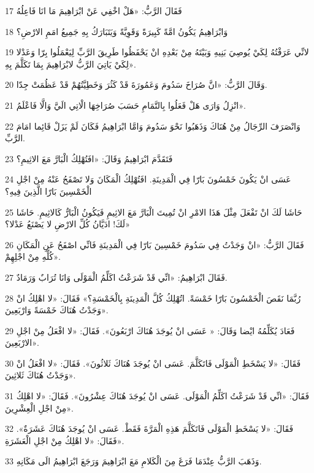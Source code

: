 \par 17 فَقَالَ الرَّبُّ: «هَلْ اخْفِي عَنْ ابْرَاهِيمَ مَا انَا فَاعِلُهُ
\par 18 وَابْرَاهِيمُ يَكُونُ امَّةً كَبِيرَةً وَقَوِيَّةً وَيَتَبَارَكُ بِهِ جَمِيعُ امَمِ الارْضِ؟
\par 19 لانِّي عَرَفْتُهُ لِكَيْ يُوصِيَ بَنِيهِ وَبَيْتَهُ مِنْ بَعْدِهِ انْ يَحْفَظُوا طَرِيقَ الرَّبِّ لِيَعْمَلُوا بِرّا وَعَدْلا لِكَيْ يَاتِيَ الرَّبُّ لابْرَاهِيمَ بِمَا تَكَلَّمَ بِهِ».
\par 20 وَقَالَ الرَّبُّ: «انَّ صُرَاخَ سَدُومَ وَعَمُورَةَ قَدْ كَثُرَ وَخَطِيَّتُهُمْ قَدْ عَظُمَتْ جِدّا.
\par 21 انْزِلُ وَارَى هَلْ فَعَلُوا بِالتَّمَامِ حَسَبَ صُرَاخِهَا الْاتِي الَيَّ وَالَّا فَاعْلَمُ».
\par 22 وَانْصَرَفَ الرِّجَالُ مِنْ هُنَاكَ وَذَهَبُوا نَحْوَ سَدُومَ وَامَّا ابْرَاهِيمُ فَكَانَ لَمْ يَزَلْ قَائِما امَامَ الرَّبِّ.
\par 23 فَتَقَدَّمَ ابْرَاهِيمُ وَقَالَ: «افَتُهْلِكُ الْبَارَّ مَعَ الاثِيمِ؟
\par 24 عَسَى انْ يَكُونَ خَمْسُونَ بَارّا فِي الْمَدِينَةِ. افَتُهْلِكُ الْمَكَانَ وَلا تَصْفَحُ عَنْهُ مِنْ اجْلِ الْخَمْسِينَ بَارّا الَّذِينَ فِيهِ؟
\par 25 حَاشَا لَكَ انْ تَفْعَلَ مِثْلَ هَذَا الامْرِ انْ تُمِيتَ الْبَارَّ مَعَ الاثِيمِ فَيَكُونُ الْبَارُّ كَالاثِيمِ. حَاشَا لَكَ! ادَيَّانُ كُلِّ الارْضِ لا يَصْنَعُ عَدْلا؟»
\par 26 فَقَالَ الرَّبُّ: «انْ وَجَدْتُ فِي سَدُومَ خَمْسِينَ بَارّا فِي الْمَدِينَةِ فَانِّي اصْفَحُ عَنِ الْمَكَانِ كُلِّهِ مِنْ اجْلِهِمْ».
\par 27 فَقَالَ ابْرَاهِيمُ: «انِّي قَدْ شَرَعْتُ اكَلِّمُ الْمَوْلَى وَانَا تُرَابٌ وَرَمَادٌ.
\par 28 رُبَّمَا نَقَصَ الْخَمْسُونَ بَارّا خَمْسَةً. اتُهْلِكُ كُلَّ الْمَدِينَةِ بِالْخَمْسَةِ؟» فَقَالَ: «لا اهْلِكُ انْ وَجَدْتُ هُنَاكَ خَمْسَةً وَارْبَعِينَ».
\par 29 فَعَادَ يُكَلِّمُهُ ايْضا وَقَالَ: « عَسَى انْ يُوجَدَ هُنَاكَ ارْبَعُونَ». فَقَالَ: «لا افْعَلُ مِنْ اجْلِ الارْبَعِينَ».
\par 30 فَقَالَ: «لا يَسْخَطِ الْمَوْلَى فَاتَكَلَّمَ. عَسَى انْ يُوجَدَ هُنَاكَ ثَلاثُونَ». فَقَالَ: «لا افْعَلُ انْ وَجَدْتُ هُنَاكَ ثَلاثِينَ».
\par 31 فَقَالَ: «انِّي قَدْ شَرَعْتُ اكَلِّمُ الْمَوْلَى. عَسَى انْ يُوجَدَ هُنَاكَ عِشْرُونَ». فَقَالَ: «لا اهْلِكُ مِنْ اجْلِ الْعِشْرِينَ».
\par 32 فَقَالَ: «لا يَسْخَطِ الْمَوْلَى فَاتَكَلَّمَ هَذِهِ الْمَرَّةَ فَقَطْ. عَسَى انْ يُوجَدَ هُنَاكَ عَشَرَةٌ». فَقَالَ: «لا اهْلِكُ مِنْ اجْلِ الْعَشَرَةِ».
\par 33 وَذَهَبَ الرَّبُّ عِنْدَمَا فَرَغَ مِنَ الْكَلامِ مَعَ ابْرَاهِيمَ وَرَجَعَ ابْرَاهِيمُ الَى مَكَانِهِ.

